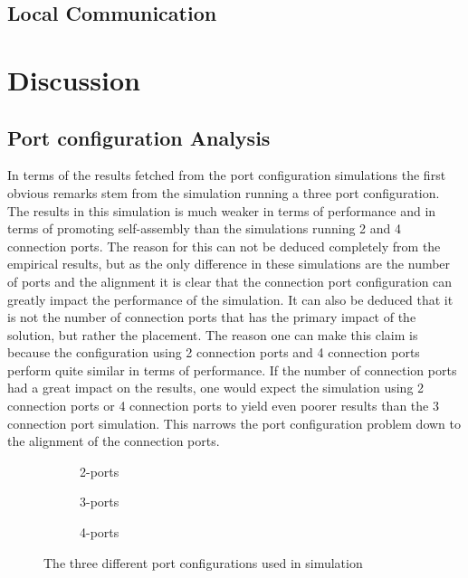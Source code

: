 \newpage

%

\newpage
\pagestyle{main}

\subsection{Local Communication}

\section{Discussion}

\subsection{Port configuration Analysis}
In terms of the results fetched from the port configuration simulations the first obvious remarks stem from the simulation running a three port configuration.
The results in this simulation is much weaker in terms of performance and in terms of promoting self-assembly than the simulations running 2 and 4 connection ports.
The reason for this can not be deduced completely from the empirical results, but as the only difference in these simulations are the number of ports and the alignment it is clear that the connection port configuration can greatly impact the performance of the simulation.
It can also be deduced that it is not the number of connection ports that has the primary impact of the solution, but rather the placement.
The reason one can make this claim is because the configuration using 2 connection ports and 4 connection ports perform quite similar in terms of performance.
If the number of connection ports had a great impact on the results, one would expect the simulation using 2 connection ports or 4 connection ports to yield even poorer results than the 3 connection port simulation.
This narrows the port configuration problem down to the alignment of the connection ports.

\begin{figure}[H]
	\centering
	\begin{subfigure}[b]{0.31\textwidth}
		\centering
		\caption{2-ports}
	\end{subfigure}
	\begin{subfigure}[b]{0.31\textwidth}
		\centering
		\caption{3-ports}
	\end{subfigure}
	\begin{subfigure}[b]{0.31\textwidth}
		\centering
		\caption{4-ports}
	\end{subfigure}
	\caption{The three different port configurations used in simulation}
	\label{fig:robot-port-configuration}
\end{figure}

